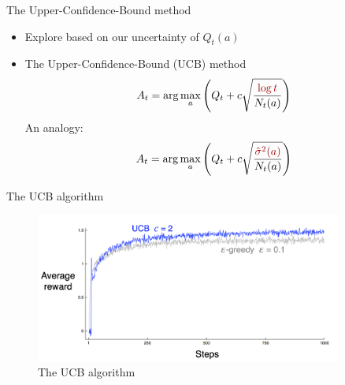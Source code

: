 \documentclass[10pt]{beamer}
\begin{document}
\begin{frame}{The Upper-Confidence-Bound method}

\begin{itemize}
\item Explore based on our uncertainty of $Q_t(a)$\pause
\item The Upper-Confidence-Bound (UCB) method
\[
A_t = \arg \max_a \left( Q_{t} + c \sqrt{\frac{{\color{uured} \log t}}{N_t(a)}}  \right)
\]
An analogy:
\[
A_t = \arg \max_a \left( Q_{t} + c \sqrt{\frac{{\color{uured}\hat{\sigma}^2(a)}}{N_t(a)}} \right)
\]
\end{itemize}

\end{frame}


\begin{frame}{The UCB algorithm}

\begin{figure}[h]
\centering
\includegraphics[width=0.9\textwidth]{fig/sutton_fig_2_4.png}
\caption{The UCB algorithm}
\end{figure}

\end{frame}

\end{document}
